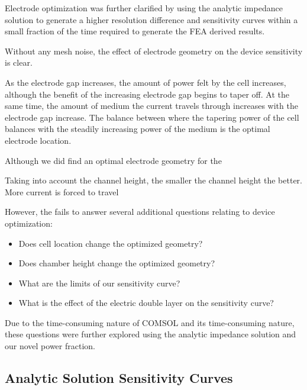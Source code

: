 \par Electrode optimization was further clarified by using the analytic impedance solution to generate a higher resolution difference and sensitivity curves within a small fraction of the time required to generate the FEA derived results. 

\par Without any mesh noise, the effect of electrode geometry on the device sensitivity is clear. 

\par As the electrode gap increases, the amount of power felt by the cell increases, although the benefit of the increasing electrode gap begins to taper off. At the same time, the amount of medium the current travels through increases with the electrode gap increase. The balance between where the tapering power of the cell balances with the steadily increasing power of the medium is the optimal electrode location.

\par Although we did find an optimal electrode geometry for the 

\par Taking into account the channel height, the smaller the channel height the better. More current is forced to travel 

\par However, the fails to answer several additional questions relating to device optimization:
\begin{itemize}
    \item Does cell location change the optimized geometry?
    \item Does chamber height change the optimized geometry?
    \item What are the limits of our sensitivity curve?
    \item What is the effect of the electric double layer on the sensitivity curve?
\end{itemize}

\par Due to the time-consuming nature of COMSOL and its time-consuming nature, these questions were further explored using the analytic impedance solution and our novel power fraction.

\FloatBarrier

\subsection{Analytic Solution Sensitivity Curves}

